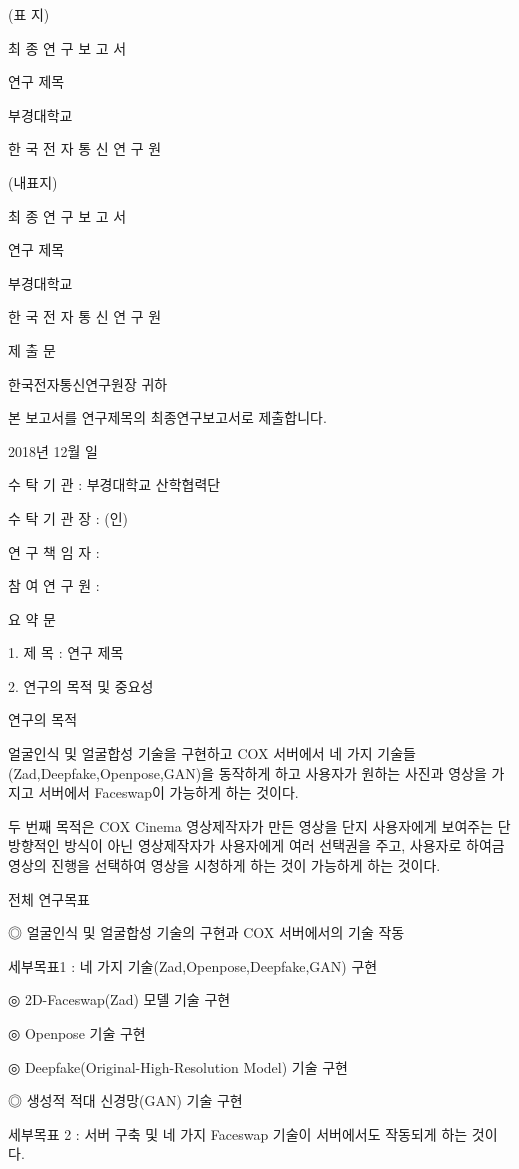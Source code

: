 \documentclass{oblivoir}
\begin{document}
\tableofcontents
\listoffigures
\listoftables


(표  지)

최 종 연 구 보 고 서

연구 제목

부경대학교

한 국 전 자 통 신 연 구 원

(내표지)

최 종 연 구 보 고 서

연구 제목

부경대학교

한 국 전 자 통 신 연 구 원

제     출     문

한국전자통신연구원장  귀하

본 보고서를 연구제목의 최종연구보고서로 제출합니다. 

2018년 12월 일

수  탁  기  관 :  부경대학교 산학협력단

수 탁 기 관 장 :           (인)

연 구 책 임 자 :  

참 여 연 구 원 :  

  요     약     문

1. 제   목 : 연구 제목 

2. 연구의 목적 및 중요성

 연구의 목적

 얼굴인식 및 얼굴합성 기술을 구현하고 COX 서버에서 네 가지 기술들(Zad,Deepfake,Openpose,GAN)을 동작하게 하고 사용자가 원하는 사진과 영상을 가지고 서버에서 Faceswap이 가능하게 하는 것이다. 

 두 번째 목적은 COX Cinema 영상제작자가 만든 영상을 단지 사용자에게 보여주는 단방향적인 방식이 아닌 영상제작자가 사용자에게 여러 선택권을 주고, 사용자로 하여금 영상의 진행을 선택하여 영상을 시청하게 하는 것이 가능하게 하는 것이다. 

전체 연구목표

◎ 얼굴인식 및 얼굴합성 기술의 구현과 COX 서버에서의 기술 작동

 세부목표1 : 네 가지 기술(Zad,Openpose,Deepfake,GAN) 구현

◎ 2D-Faceswap(Zad) 모델 기술 구현

◎ Openpose 기술 구현

◎ Deepfake(Original-High-Resolution Model) 기술 구현 

◎ 생성적 적대 신경망(GAN) 기술 구현 

 세부목표 2 : 서버 구축 및 네 가지 Faceswap 기술이 서버에서도 작동되게 하는 것이다.
\end{document}
